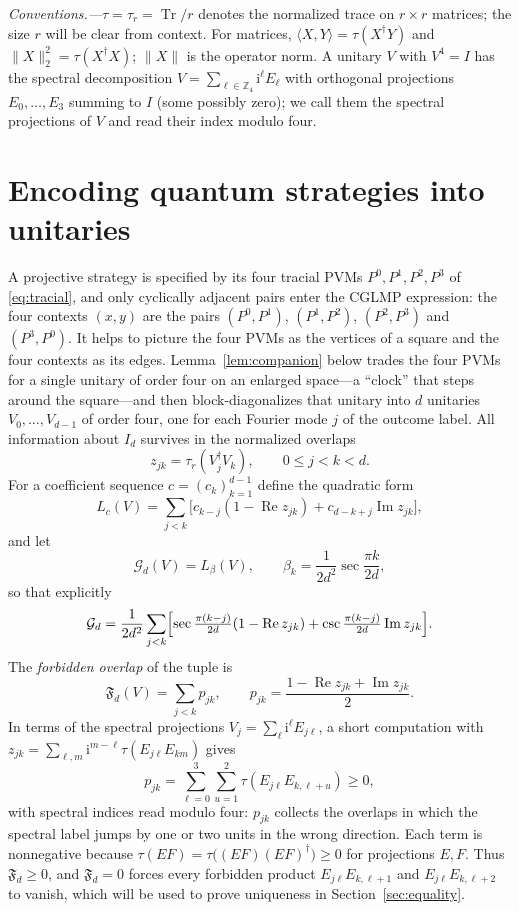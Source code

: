\documentclass[aps,prl,reprint,superscriptaddress,longbibliography,floatfix,raggedbottom]{revtex4-2}
\newcommand{\Z}{\mathbb Z}
\newcommand{\ii}{\mathrm i}
\newcommand{\norm}[1]{\lVert #1\rVert}
\newcommand{\ip}[2]{\langle #1,#2\rangle}
\DeclareMathOperator{\Tr}{Tr}
\newcommand{\tr}{\tau}
\newcommand{\Fd}{\mathfrak F_d}
\newcommand{\Gd}{\mathcal G_d}
\begin{document}
\emph{Conventions.---}$\tr=\tr_r=\Tr/r$ denotes the normalized trace on
$r\times r$ matrices; the size $r$ will be clear from context. For
matrices, $\ip XY=\tr(X^\dagger Y)$ and $\norm X_2^2=\tr(X^\dagger X)$;
$\norm X$ is the operator norm. A unitary $V$ with $V^4=I$ has the
spectral decomposition $V=\sum_{\ell\in\Z_4}\ii^{\ell}E_\ell$ with
orthogonal projections $E_0,\dots,E_3$ summing to $I$ (some possibly
zero); we call them the spectral projections of $V$ and read their index
modulo four.

\section{Encoding quantum strategies into unitaries}
\label{sec:reduction}

A projective strategy is specified by its four tracial PVMs
$P^0,P^1,P^2,P^3$ of \eqref{eq:tracial}, and only cyclically adjacent
pairs enter the CGLMP expression: the four contexts $(x,y)$ are the
pairs $(P^0,P^1)$, $(P^1,P^2)$, $(P^2,P^3)$ and $(P^3,P^0)$. It helps
to picture the four PVMs as the vertices of a square and the four
contexts as its edges. Lemma~\ref{lem:companion} below trades the four
PVMs for a single unitary of order four on an enlarged space---a
``clock'' that steps around the square---and then block-diagonalizes
that unitary into $d$ unitaries $V_0,\dots,V_{d-1}$ of order four, one
for each Fourier mode $j$ of the outcome label. All information about
$I_d$ survives in the normalized overlaps
\[
z_{jk}=\tr_r(V_j^\dagger V_k),\qquad 0\le j<k<d .
\]
For a coefficient sequence $c=(c_k)_{k=1}^{d-1}$ define the quadratic
form
\begin{equation}\label{eq:Lc}
L_c(V)=\sum_{j<k}
\bigl[c_{k-j}(1-\operatorname{Re}z_{jk})+c_{d-k+j}
\operatorname{Im}z_{jk}\bigr],
\end{equation}
and let
\begin{equation}\label{eq:Gdef}
\Gd(V)=L_\beta(V),\qquad \beta_k=\frac1{2d^2}\sec\frac{\pi k}{2d},
\end{equation}
so that explicitly
\[
\Gd=\frac1{2d^2}\sum_{j<k}\Bigl[\sec\tfrac{\pi(k-j)}{2d}
(1-\operatorname{Re}z_{jk})
+\csc\tfrac{\pi(k-j)}{2d}\operatorname{Im}z_{jk}\Bigr].
\]
The \emph{forbidden overlap} of the tuple is
\begin{equation}\label{eq:forbidden}
\Fd(V)=\sum_{j<k}p_{jk},\qquad
p_{jk}=\frac{1-\operatorname{Re}z_{jk}+\operatorname{Im}z_{jk}}2 .
\end{equation}
In terms of the spectral projections $V_j=\sum_\ell\ii^\ell E_{j\ell}$,
a short computation with
$z_{jk}=\sum_{\ell,m}\ii^{m-\ell}\tr(E_{j\ell}E_{km})$ gives
\begin{equation}\label{eq:forbiddenspectral}
p_{jk}=\sum_{\ell=0}^3\sum_{u=1}^2\tr(E_{j\ell}E_{k,\ell+u})\ge0,
\end{equation}
with spectral indices read modulo four: $p_{jk}$ collects the overlaps
in which the spectral label jumps by one or two units in the wrong
direction. Each term is nonnegative because
$\tr(EF)=\tr\bigl((EF)(EF)^\dagger\bigr)\ge0$ for projections $E,F$.
Thus $\Fd\ge0$, and $\Fd=0$ forces every forbidden product
$E_{j\ell}E_{k,\ell+1}$ and $E_{j\ell}E_{k,\ell+2}$ to vanish, which will be used to prove uniqueness in Section~\ref{sec:equality}.
\end{document}
